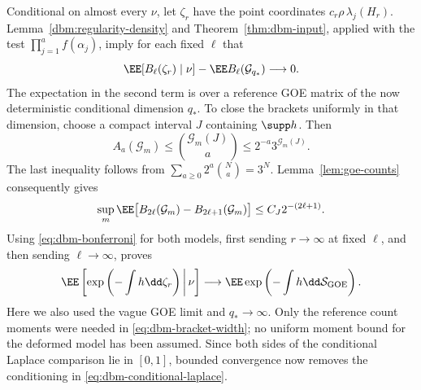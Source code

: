 Conditional on almost every \(\nu\), let \(\zeta_r\) have the point
coordinates \(c_r\rho\,\lambda_j(H_r)\).
Lemma~\ref{dbm:regularity-density} and Theorem~\ref{thm:dbm-input},
applied with the test \(\prod_{j=1}^a f(\alpha_j)\), imply for each
fixed \(\ell\) that
\[
 \EE[B_\ell(\zeta_r)\mid\nu]
       -\EE B_\ell(\mathcal G_{q_*})\longrightarrow0.
\]
The expectation in the second term is over a reference GOE matrix
of the now deterministic conditional dimension \(q_*\).
To close the brackets uniformly in that dimension, choose a compact
interval \(J\) containing \(\supp h\). Then
\[
 A_a(\mathcal G_m)\le
     \binom{\mathcal G_m(J)}a
     \le 2^{-a}3^{\mathcal G_m(J)}.
\]
The last inequality follows from
\(\sum_{a\ge0}2^a\binom{N}{a}=3^N\).
Lemma~\ref{lem:goe-counts} consequently gives
\begin{equation}
 \label{eq:dbm-bracket-width}
 \sup_m\EE\bigl[B_{2\ell}(\mathcal G_m)
                 -B_{2\ell+1}(\mathcal G_m)\bigr]
       \le C_J2^{-(2\ell+1)}.
\end{equation}
Using \eqref{eq:dbm-bonferroni} for both models, first sending
\(r\to\infty\) at fixed \(\ell\), and then sending
\(\ell\to\infty\), proves
\begin{equation}
 \label{eq:dbm-conditional-laplace}
 \EE\left[\exp\left(-\int h\dd\zeta_r\right)\,\middle|\,\nu\right]
   \longrightarrow
 \EE\exp\left(-\int h\dd\mathcal S_{\mathrm{GOE}}\right).
\end{equation}
Here we also used the vague GOE limit and \(q_*\to\infty\).
Only the reference count moments were needed in
\eqref{eq:dbm-bracket-width}; no uniform moment bound for the
deformed model has been assumed. Since both sides of the conditional
Laplace comparison lie in \([0,1]\), bounded convergence now removes
the conditioning in \eqref{eq:dbm-conditional-laplace}.

